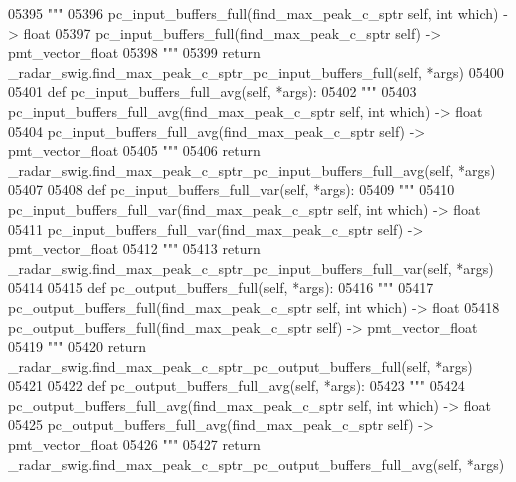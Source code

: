 \begin{DoxyCode}
{{{{{{{{{{{{{{{{{{05395         \textcolor{stringliteral}{"""}
05396 \textcolor{stringliteral}{        pc\_input\_buffers\_full(find\_max\_peak\_c\_sptr self, int which) -> float}
05397 \textcolor{stringliteral}{        pc\_input\_buffers\_full(find\_max\_peak\_c\_sptr self) -> pmt\_vector\_float}
05398 \textcolor{stringliteral}{        """}
05399         \textcolor{keywordflow}{return} \_radar\_swig.find\_max\_peak\_c\_sptr\_pc\_input\_buffers\_full(self, *args)
05400 
05401     \textcolor{keyword}{def }pc_input_buffers_full_avg(self, *args):
05402         \textcolor{stringliteral}{"""}
05403 \textcolor{stringliteral}{        pc\_input\_buffers\_full\_avg(find\_max\_peak\_c\_sptr self, int which) -> float}
05404 \textcolor{stringliteral}{        pc\_input\_buffers\_full\_avg(find\_max\_peak\_c\_sptr self) -> pmt\_vector\_float}
05405 \textcolor{stringliteral}{        """}
05406         \textcolor{keywordflow}{return} \_radar\_swig.find\_max\_peak\_c\_sptr\_pc\_input\_buffers\_full\_avg(self, *args)
05407 
05408     \textcolor{keyword}{def }pc_input_buffers_full_var(self, *args):
05409         \textcolor{stringliteral}{"""}
05410 \textcolor{stringliteral}{        pc\_input\_buffers\_full\_var(find\_max\_peak\_c\_sptr self, int which) -> float}
05411 \textcolor{stringliteral}{        pc\_input\_buffers\_full\_var(find\_max\_peak\_c\_sptr self) -> pmt\_vector\_float}
05412 \textcolor{stringliteral}{        """}
05413         \textcolor{keywordflow}{return} \_radar\_swig.find\_max\_peak\_c\_sptr\_pc\_input\_buffers\_full\_var(self, *args)
05414 
05415     \textcolor{keyword}{def }pc_output_buffers_full(self, *args):
05416         \textcolor{stringliteral}{"""}
05417 \textcolor{stringliteral}{        pc\_output\_buffers\_full(find\_max\_peak\_c\_sptr self, int which) -> float}
05418 \textcolor{stringliteral}{        pc\_output\_buffers\_full(find\_max\_peak\_c\_sptr self) -> pmt\_vector\_float}
05419 \textcolor{stringliteral}{        """}
05420         \textcolor{keywordflow}{return} \_radar\_swig.find\_max\_peak\_c\_sptr\_pc\_output\_buffers\_full(self, *args)
05421 
05422     \textcolor{keyword}{def }pc_output_buffers_full_avg(self, *args):
05423         \textcolor{stringliteral}{"""}
05424 \textcolor{stringliteral}{        pc\_output\_buffers\_full\_avg(find\_max\_peak\_c\_sptr self, int which) -> float}
05425 \textcolor{stringliteral}{        pc\_output\_buffers\_full\_avg(find\_max\_peak\_c\_sptr self) -> pmt\_vector\_float}
05426 \textcolor{stringliteral}{        """}
05427         \textcolor{keywordflow}{return} \_radar\_swig.find\_max\_peak\_c\_sptr\_pc\_output\_buffers\_full\_avg(self, *args)
}}}}}}}}}}}}}}}}}}
\end{DoxyCode}
